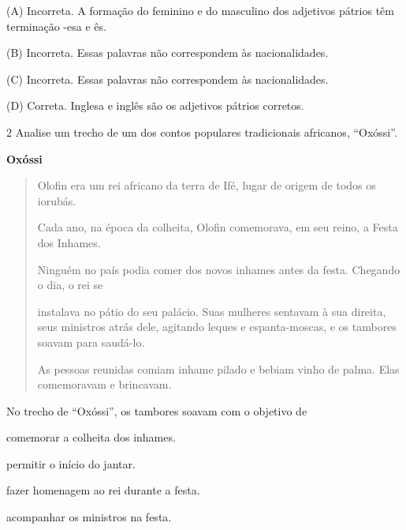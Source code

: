 
(A) Incorreta. A formação do feminino e do masculino dos adjetivos
pátrios têm terminação -esa e ês.

(B) Incorreta. Essas palavras não correspondem às nacionalidades.

(C) Incorreta. Essas palavras não correspondem às nacionalidades.

(D) Correta. Inglesa e inglês são os adjetivos pátrios corretos.

\num{2} Analise um trecho de um dos contos populares tradicionais africanos, ``Oxóssi''.

\textbf{Oxóssi}

\begin{quote}
Olofin era um rei africano da terra de Ifé, lugar de origem de todos os
iorubás.

Cada ano, na época da colheita, Olofin comemorava, em seu reino, a Festa
dos Inhames.

Ninguém no país podia comer dos novos inhames antes da festa. Chegando o
dia, o rei se

instalava no pátio do seu palácio. Suas mulheres sentavam à sua direita,
seus ministros atrás dele, agitando leques e espanta-moscas, e os
tambores soavam para saudá-lo.

As pessoas reunidas comiam inhame pilado e bebiam vinho de palma. Elas
comemoravam e brincavam.
\end{quote}


No trecho de ``Oxóssi'', os tambores soavam com o objetivo de

\begin{escolha}
\item comemorar a colheita dos inhames.

\item permitir o início do jantar.

\item fazer homenagem ao rei durante a festa.

\item acompanhar os ministros na festa.
\end{escolha}

